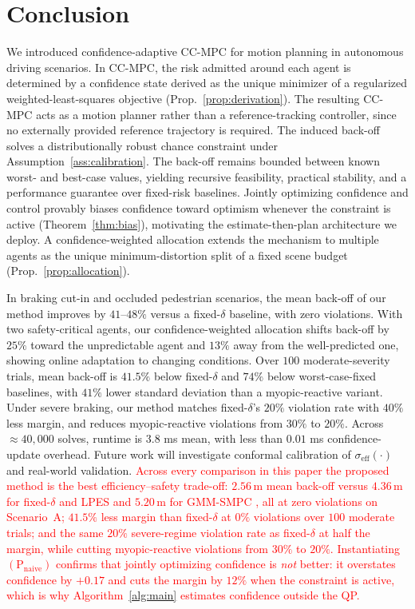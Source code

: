 \documentclass[letterpaper, 10 pt, conference]{ieeeconf}
\begin{document}
\section{Conclusion}

We introduced confidence-adaptive CC-MPC for motion planning in autonomous driving scenarios. In CC-MPC, the risk admitted around each agent is determined by a confidence state derived as the unique minimizer of a regularized weighted-least-squares objective (Prop.~\ref{prop:derivation}). The resulting CC-MPC acts as a motion planner rather than a reference-tracking controller, since no externally provided reference trajectory is required. The induced back-off solves a distributionally robust chance constraint under Assumption~\ref{ass:calibration}. The back-off remains bounded between known worst- and best-case values, yielding recursive feasibility, practical stability, and a performance guarantee over fixed-risk baselines. Jointly optimizing confidence and control provably biases confidence toward optimism whenever the constraint is active (Theorem~\ref{thm:bias}), motivating the estimate-then-plan architecture we deploy. A confidence-weighted allocation extends the mechanism to multiple agents as the unique minimum-distortion split of a fixed scene budget (Prop.~\ref{prop:allocation}).

In braking cut-in and occluded pedestrian scenarios, the mean back-off of our method improves by $41$--$48\%$ versus a fixed-$\delta$ baseline, with zero violations. With two safety-critical agents, our confidence-weighted allocation shifts back-off by $25\%$ toward the unpredictable agent and $13\%$ away from the well-predicted one, showing online adaptation to changing conditions. Over $100$ moderate-severity trials, mean back-off is $41.5\%$ below fixed-$\delta$ and $74\%$ below worst-case-fixed baselines, with $41\%$ lower standard deviation than a myopic-reactive variant. Under severe braking, our method matches fixed-$\delta$'s $20\%$ violation rate with $40\%$ less margin, and reduces myopic-reactive violations from $30\%$ to $20\%$. Across $\approx40{,}000$ solves, runtime is $3.8$ ms mean, with less than $0.01$ ms confidence-update overhead. Future work will investigate conformal calibration of $\sigma_{\mathrm{eff}}(\cdot)$ and real-world validation.
\textcolor{red}{Across every comparison in this paper the proposed method is the best efficiency--safety trade-off: $2.56\,\mathrm{m}$ mean back-off versus $4.36\,\mathrm{m}$ for fixed-$\delta$ and LPES \cite{ma2026sensor} and $5.20\,\mathrm{m}$ for GMM-SMPC \cite{engelaar2025stochastic}, all at zero violations on Scenario~A; $41.5\%$ less margin than fixed-$\delta$ at $0\%$ violations over $100$ moderate trials; and the same $20\%$ severe-regime violation rate as fixed-$\delta$ at half the margin, while cutting myopic-reactive violations from $30\%$ to $20\%$. Instantiating $(\mathrm P_{\mathrm{naive}})$ confirms that jointly optimizing confidence is \emph{not} better: it overstates confidence by $+0.17$ and cuts the margin by $12\%$ when the constraint is active, which is why Algorithm~\ref{alg:main} estimates confidence outside the QP.}



\end{document}
